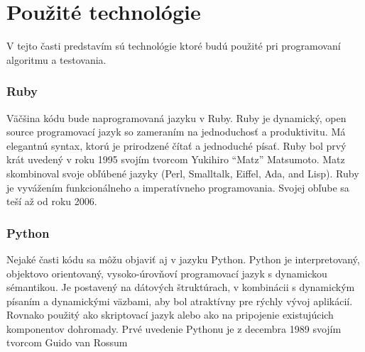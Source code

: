\section{Použité technológie} 
V tejto časti predstavím sú technológie ktoré budú použité pri programovaní algoritmu a testovania. 
\subsubsection{Ruby} 
Väčšina kódu bude naprogramovaná jazyku v Ruby. Ruby je dynamický, open source programovací jazyk so zameraním na jednoduchosť a produktivitu. Má elegantnú syntax, ktorú je prirodzené čítať a jednoduché písať. Ruby bol prvý krát uvedený v roku 1995 svojím tvorcom Yukihiro “Matz” Matsumoto. Matz skombinoval svoje obľúbené jazyky (Perl, Smalltalk, Eiffel, Ada, and Lisp). Ruby je vyvážením funkcionálneho a imperatívneho programovania. Svojej obľube sa teší až od roku 2006.\cite{Rb} 
\subsubsection{Python} 
Nejaké časti kódu sa môžu objaviť aj v jazyku Python. Python je interpretovaný, objektovo orientovaný, vysoko-úrovňoví programovací jazyk s dynamickou sémantikou. Je postavený na dátových štruktúrach, v kombinácii s dynamickým písaním a dynamickými väzbami, aby bol atraktívny pre rýchly vývoj aplikácií. Rovnako použitý ako skriptovací jazyk alebo ako  na pripojenie existujúcich komponentov dohromady. Prvé uvedenie Pythonu je z decembra 1989 svojím tvorcom Guido van Rossum\cite{Pt} 
